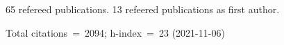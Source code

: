 65 refereed publications. 13 refeered publications as first author.

Total citations~=~2094; h-index~=~23 (2021-11-06)